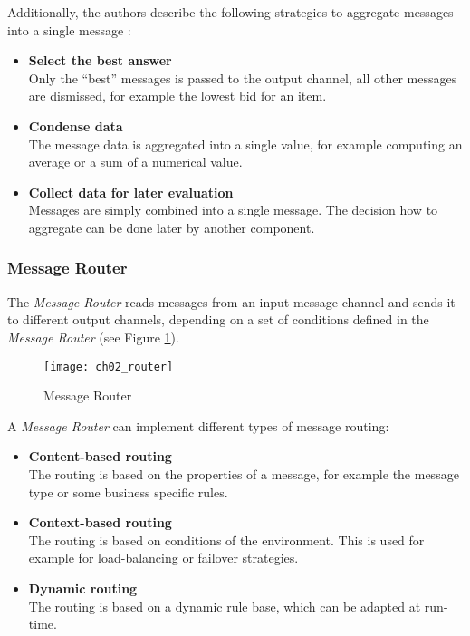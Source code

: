 Additionally, the authors describe the following strategies to aggregate messages into a single message \citep{Hohpe:2003fk}:
\begin{itemize}
	\item \textbf{Select the best answer}\\
	Only the ``best'' messages is passed to the output channel, all other messages are dismissed, for example the lowest bid for an item.
	\item \textbf{Condense data}\\
	The message data is aggregated into a single value, for example computing an average or a sum of a numerical value.
	\item \textbf{Collect data for later evaluation}\\
	Messages are simply combined into a single message. The decision how to aggregate can be done later by another component.
\end{itemize}

\subsubsection{Message Router}
The \emph{Message Router} reads messages from an input message channel and sends it to different output channels, depending on a set of conditions defined in the \emph{Message Router} (see Figure \ref{fig:ch02_message_router}).

\begin{figure}[htbp]
	\centering
	\texttt{[image: ch02\_router]}
	\caption{Message Router \citep{Hohpe:2003fk}}
	\label{fig:ch02_message_router}
\end{figure}

A \emph{Message Router} can implement different types of message routing:
\begin{itemize}
	\item \textbf{Content-based routing}\\
	The routing is based on the properties of a message, for example the message type or some business specific rules.
	\item \textbf{Context-based routing}\\
	The routing is based on conditions of the environment. This is used for example for load-balancing or failover strategies.
	\item \textbf{Dynamic routing}\\
	The routing is based on a dynamic rule base, which can be adapted at run-time.
\end{itemize}

